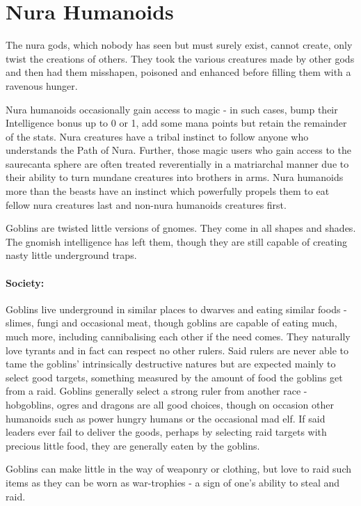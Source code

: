 \section{Nura Humanoids}

The nura gods, which nobody has seen but must surely exist, cannot create, only twist the creations of others.  They took the various creatures made by other gods and then had them misshapen, poisoned and enhanced before filling them with a ravenous hunger.

Nura humanoids occasionally gain access to magic - in such cases, bump their Intelligence bonus up to 0 or 1, add some mana points but retain the remainder of the stats.  Nura creatures have a tribal instinct to follow anyone who understands the Path of Nura.  Further, those magic users who gain access to the saurecanta sphere are often treated reverentially in a matriarchal manner due to their ability to turn mundane creatures into brothers in arms.  Nura humanoids more than the beasts have an instinct which powerfully propels them to eat fellow nura creatures last and non-nura humanoids creatures first.

\label{goblin}
\goblin

Goblins are twisted little versions of gnomes.  They come in all shapes and shades.  The gnomish intelligence has left them, though they are still capable of creating nasty little underground traps.

\paragraph{Society:} Goblins live underground in similar places to dwarves and eating similar foods - slimes, fungi and occasional meat, though goblins are capable of eating much, much more, including cannibalising each other if the need comes.  They naturally love tyrants and in fact can respect no other rulers.  Said rulers are never able to tame the goblins' intrinsically destructive natures but are expected mainly to select good targets, something measured by the amount of food the goblins get from a raid.  Goblins generally select a strong ruler from another race - hobgoblins, ogres and dragons are all good choices, though on occasion other humanoids such as power hungry humans or the occasional mad elf.  If said leaders ever fail to deliver the goods, perhaps by selecting raid targets with precious little food, they are generally eaten by the goblins.

	Goblins can make little in the way of weaponry or clothing, but love to raid such items as they can be worn as war-trophies - a sign of one's ability to steal and raid.

